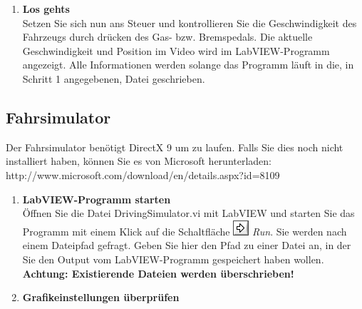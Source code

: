 \begin{enumerate}[label=\arabic*.]
\item \textbf{Los gehts}\\
Setzen Sie sich nun ans Steuer und kontrollieren Sie die Geschwindigkeit des Fahrzeugs durch drücken des Gas- bzw. Bremspedals. Die aktuelle Geschwindigkeit und Position im Video wird im LabVIEW-Programm angezeigt. Alle Informationen werden solange das Programm läuft in die, in Schritt 1 angegebenen, Datei geschrieben.
	
\end{enumerate}

\subsection{Fahrsimulator}
Der Fahrsimulator benötigt DirectX 9 um zu laufen. Falls Sie dies noch nicht installiert haben, können Sie es von Microsoft herunterladen: http://www.microsoft.com/download/en/details.aspx?id=8109

\begin{enumerate}[label=\arabic*.]

\item \textbf{LabVIEW-Programm starten}\\
Öffnen Sie die Datei DrivingSimulator.vi mit LabVIEW und starten Sie das Programm mit einem Klick auf die Schaltfläche \includegraphics[height=\ht\strutbox]{src/icon_labview_run.png} \textit{Run}. Sie werden nach einem Dateipfad gefragt. Geben Sie hier den Pfad zu einer Datei an, in der Sie den Output vom LabVIEW-Programm gespeichert haben wollen. \textbf{Achtung: Existierende Dateien werden überschrieben!}

\item \textbf{Grafikeinstellungen überprüfen}\\


\end{enumerate}
